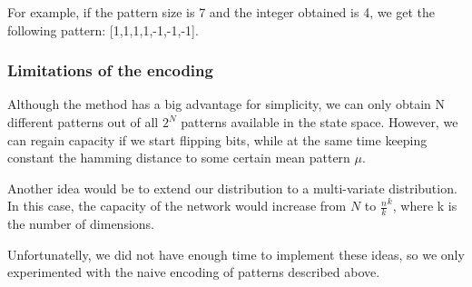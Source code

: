 For example, if the pattern size is 7 and the integer obtained is 4, we get the following pattern: [1,1,1,1,-1,-1,-1]. 

\subsubsection{Limitations of the encoding}

Although the method has a big advantage for simplicity, we can only obtain N different patterns out of all \( 2^N\) patterns available in the state space. However, we can regain capacity if we start flipping bits, while at the same time keeping constant the hamming distance to some certain mean pattern \(\mu\).

Another idea would be to extend our distribution to a multi-variate distribution. In this case, the capacity of the network would increase from \(N\) to \(\frac{n}{k}^k\), where k is the number of dimensions. 

Unfortunatelly, we did not have enough time to implement these ideas, so we only experimented with the naive encoding of patterns described above. 
